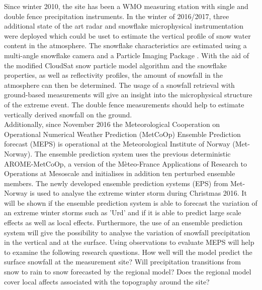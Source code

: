 \par\medskip
\noindent
Since winter 2010, the site has been a WMO measuring station with single and double fence precipitation instruments. In the winter of 2016/2017, three additional state of the art radar and snowflake microphysical instrumentation were deployed which could be uset to estimate the vertical profile of snow water content in the atmosphere. The snowflake characteristics are estimated using a multi-angle snowflake camera \citep[MASC;][]{garrett_fall_2012} and a Particle Imaging Package \citep[][PiP;]{newman_presenting_2009}. With the aid of the modified CloudSat snow particle model algorithm and the snowflake properties, as well as reflectivity profiles, the amount of snowfall in the atmosphere can then be determined. The usage of a snowfall retrieval with ground-based measurements will give an insight into the microphysical structure of the extreme event. The double fence measurements should help to estimate vertically derived snowfall on the ground.
\\
Additionally, since November 2016 the Meteorological Cooperation on Operational Numerical Weather Prediction (MetCoOp) Ensemble Prediction forecast (MEPS) is operational at the Meteorological Institute of Norway (Met-Norway). The ensemble prediction system uses the previous deterministic AROME-MetCoOp, a version of the Mèteo-France Applications of Research to Operations at Mesoscale and initialises in addition ten perturbed ensemble members. The newly developed ensemble prediction systems (EPS) from Met-Norway is used to analyse the extreme winter storm during Christmas 2016. It will be shown if the ensemble prediction system is able to forecast the variation of an extreme winter storms such as 'Urd' and if it is able to predict large scale effects as well as local effects. Furthermore, the use of an ensemble prediction system will give the possibility to analyse the variation of snowfall precipitation in the vertical and at the surface. Using observations to evaluate MEPS will help to examine the following research questions. How well will the model predict the surface snowfall at the measurement site? Will precipitation transitions from snow to rain to snow forecasted by the regional model?
Does the regional model cover local affects associated with the topography around the site?
\par\medskip
